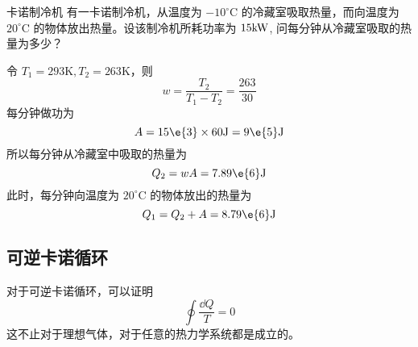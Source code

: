 \begin{example}{卡诺制冷机}
有一卡诺制冷机，从温度为 $-10^{\circ} \mathrm{C}$ 的冷藏室吸取热量，而向温度为 $20^{\circ} \mathrm{C}$ 的物体放出热量。设该制冷机所耗功率为 $15\rm kW$, 问每分钟从冷藏室吸取的热量为多少？

令 $T_1 = 293 \mathrm K , T_2 = 263 \mathrm K $，则
\begin{equation}
w=\frac{T_{2}}{T_{1}-T_{2}}=\frac{263}{30}
\end{equation}
每分钟做功为
\begin{equation}
A=15\e{3} \times 60 \mathrm{J}=9\e{5} \mathrm{J}
\end{equation}
所以每分钟从冷藏室中吸取的热量为
\begin{equation}
Q_{2}=w A=7.89\e{6} \mathrm{J}
\end{equation}
此时，每分钟向温度为 $20^{\circ} \mathrm{C}$ 的物体放出的热量为
\begin{equation}
Q_{1}=Q_{2}+A=8.79\e{6} \mathrm{J}
\end{equation}

\end{example}
\subsection{可逆卡诺循环}
对于可逆卡诺循环，可以证明
\begin{equation}
\oint \frac{\dd Q}{T}=0
\end{equation}
这不止对于理想气体，对于任意的热力学系统都是成立的。
